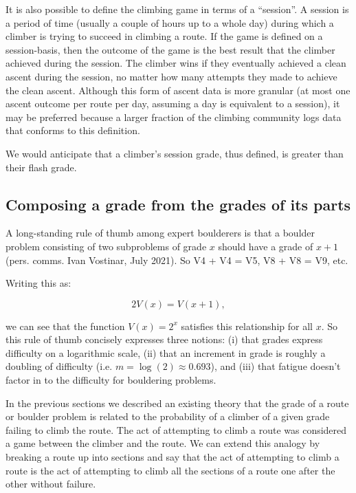 \documentclass{article}
\begin{document}
It is also possible to define the climbing game in terms of a ``session''. A session is a period of time (usually a couple of hours up to a whole day) during which a climber is trying to succeed in climbing a route. If the game is defined on a session-basis, then the outcome of the game is the best result that the climber achieved during the session. The climber wins if they eventually achieved a clean ascent during the session, no matter how many attempts they made to achieve the clean ascent. Although this form of ascent data is more granular (at most one ascent outcome per route per day, assuming a day is equivalent to a session), it may be preferred because a larger fraction of the climbing community logs data that conforms to this definition.

We would anticipate that a climber's session grade, thus defined, is greater than their flash grade. 

\subsection*{Composing a grade from the grades of its parts}

A long-standing rule of thumb among expert boulderers is that a boulder problem consisting of two subproblems of grade $x$ should have a grade of $x+1$ (pers. comms. Ivan Vostinar, July 2021). So V4 + V4 = V5, V8 + V8 = V9, etc.

Writing this as:

\begin{equation}
2V(x) = V(x+1),
\end{equation}

we can see that the function $V(x) = 2^x$ satisfies this relationship for all $x$. So this rule of thumb concisely expresses three notions: (i) that grades express difficulty on a logarithmic scale, (ii) that an increment in grade is roughly a doubling of difficulty (i.e. $m = \log(2) \approx 0.693$), and (iii) that fatigue doesn't factor in to the difficulty for bouldering problems.

In the previous sections we described an existing theory that the grade of a route or boulder problem is related to the probability of a climber of a given grade failing to climb the route. The act of attempting to climb a route was considered a game between the climber and the route. We can extend this analogy by breaking a route up into sections and say that the act of attempting to climb a route is the act of attempting to climb all the sections of a route one after the other without failure.
\end{document}
